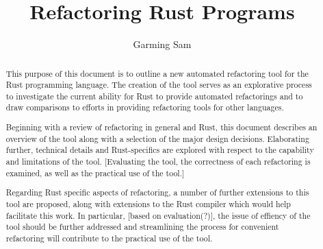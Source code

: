 \documentclass[11pt
              , a4paper
              , twoside
              , openright
              ]{report}
\title{Refactoring Rust Programs}
\author{Garming Sam}
\date{}
\begin{document}
\frontmatter



\begin{abstract}

This purpose of this document is to outline a new automated refactoring tool for the Rust programming language. The creation of the tool serves as an explorative process to investigate the current ability for Rust to provide automated refactorings and to draw comparisons to  efforts in providing refactoring tools for other languages. 

Beginning with a review of refactoring in general and Rust, this document describes an overview of the tool along with a selection of the major design decisions. Elaborating further, technical details and Rust-specifics are explored with respect to the capability and limitations of the tool. [Evaluating the tool, the correctness of each refactoring is examined, as well as the practical use of the tool.]

Regarding Rust specific aspects of refactoring, a number of further extensions to this tool are proposed, along with extensions to the Rust compiler which would help facilitate this work. In particular, [based on evaluation(?)], the issue of effiency of the tool should be further addressed and streamlining the process for convenient refactoring will contribute to the practical use of the tool.



\end{abstract}
\end{document}
